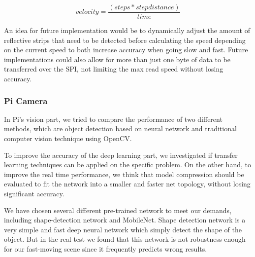 \documentclass[11pt, titlepage]{article} %
\begin{document}
\begin{equation}
    velocity = \frac{(steps*stepdistance)}{time}
    \label{eq:velocity}
\end{equation}

An idea for future implementation would be to dynamically adjust the amount of reflective strips that need to be detected before calculating the speed depending on the current speed to both increase accuracy when going slow and fast. Future implementations could also allow for more than just one byte of data to be transferred over the SPI, not limiting the max read speed without losing accuracy.

\subsubsection{Pi Camera}
In Pi’s vision part, we tried to compare the performance of two different methods, which are object detection based on neural network and traditional computer vision technique using OpenCV.

To improve the accuracy of the deep learning part, we investigated if transfer learning techniques can be applied on the specific problem. On the other hand, to improve the real time performance, we think that model compression should be evaluated to fit the network into a smaller and faster net topology, without losing significant accuracy. 

We have chosen several different pre-trained network to meet our demands, including shape-detection network and MobileNet. Shape detection network is a very simple and fast deep neural network which simply detect the shape of the object. But in the real test we found that this network is not robustness enough for our fast-moving scene since it frequently predicts wrong results.
\end{document}
